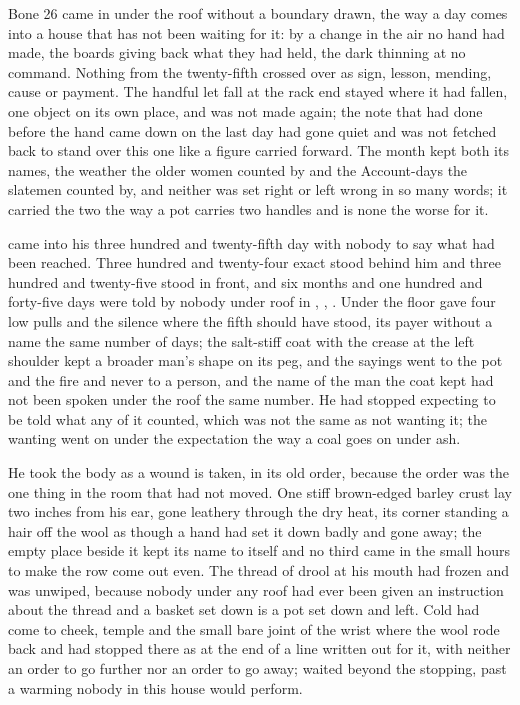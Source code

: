 
Bone 26 came in under the roof without a boundary drawn, the way a day comes into a house that has not been waiting for it: by a change in the air no hand had made, the boards giving back what they had held, the dark thinning at no command. Nothing from the twenty-fifth crossed over as sign, lesson, mending, cause or payment. The handful let fall at the rack end stayed where it had fallen, one object on its own place, and was not made again; the note that had done before the hand came down on the last day had gone quiet and was not fetched back to stand over this one like a figure carried forward. The month kept both its names, the weather the older women counted by and the Account-days the slatemen counted by, and neither was set right or left wrong in so many words; it carried the two the way a pot carries two handles and is none the worse for it.

 came into his three hundred and twenty-fifth day with nobody to say what had been reached. Three hundred and twenty-four exact stood behind him and three hundred and twenty-five stood in front, and six months and one hundred and forty-five days were told by nobody under  roof in , , . Under the floor  gave four low pulls and the silence where the fifth should have stood, its payer without a name the same number of days; the salt-stiff coat with the crease at the left shoulder kept a broader man's shape on its peg, and the sayings went to the pot and the fire and never to a person, and the name of the man the coat kept had not been spoken under the roof the same number. He had stopped expecting to be told what any of it counted, which was not the same as not wanting it; the wanting went on under the expectation the way a coal goes on under ash.

He took the body as a wound is taken, in its old order, because the order was the one thing in the room that had not moved. One stiff brown-edged barley crust lay two inches from his ear, gone leathery through the dry heat, its corner standing a hair off the wool as though a hand had set it down badly and gone away; the empty place beside it kept its name to itself and no third came in the small hours to make the row come out even. The thread of drool at his mouth had frozen and was unwiped, because nobody under any roof had ever been given an instruction about the thread and a basket set down is a pot set down and left. Cold had come to cheek, temple and the small bare joint of the wrist where the wool rode back and had stopped there as at the end of a line written out for it, with neither an order to go further nor an order to go away;  waited beyond the stopping, past a warming nobody in this house would perform.

